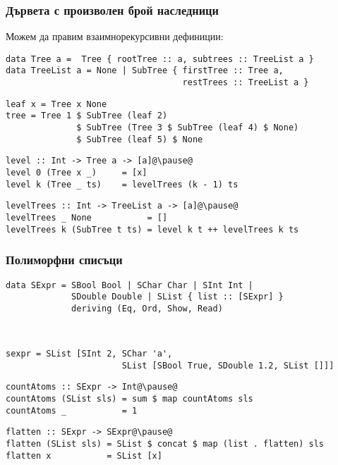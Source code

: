 \documentclass[alsotrans]{beamerswitch}
\begin{document}
\begin{frame}[fragile]
  \frametitle{Дървета с произволен брой наследници}
\small
  Можем да правим \alert{взаимнорекурсивни} дефиниции:
\begin{lstlisting}
data Tree a =  Tree { rootTree :: a, subtrees :: TreeList a }
data TreeList a = None | SubTree { firstTree :: Tree a,
                                   restTrees :: TreeList a }
\end{lstlisting}
\pause
\begin{lstlisting}
leaf x = Tree x None
tree = Tree 1 $ SubTree (leaf 2)
              $ SubTree (Tree 3 $ SubTree (leaf 4) $ None)
              $ SubTree (leaf 5) $ None
\end{lstlisting}
\pause
\begin{lstlisting}
level :: Int -> Tree a -> [a]@\pause@
level 0 (Tree x _)     = [x]
level k (Tree _ ts)    = levelTrees (k - 1) ts
\end{lstlisting}
\pause
\begin{lstlisting}
levelTrees :: Int -> TreeList a -> [a]@\pause@
levelTrees _ None           = []
levelTrees k (SubTree t ts) = level k t ++ levelTrees k ts
\end{lstlisting}
\end{frame}

\begin{frame}[fragile]
  \frametitle{Полиморфни списъци}
\small
\begin{lstlisting}
data SExpr = SBool Bool | SChar Char | SInt Int |
             SDouble Double | SList { list :: [SExpr] }
             deriving (Eq, Ord, Show, Read)
\end{lstlisting}
  \ \pause
\begin{lstlisting}
sexpr = SList [SInt 2, SChar 'a',
                       SList [SBool True, SDouble 1.2, SList []]]
\end{lstlisting}
  \pause
\begin{lstlisting}
countAtoms :: SExpr -> Int@\pause@
countAtoms (SList sls) = sum $ map countAtoms sls
countAtoms _           = 1
\end{lstlisting}
  \pause
\begin{lstlisting}
flatten :: SExpr -> SExpr@\pause@
flatten (SList sls) = SList $ concat $ map (list . flatten) sls
flatten x           = SList [x]
\end{lstlisting}
\end{frame}
\end{document}
